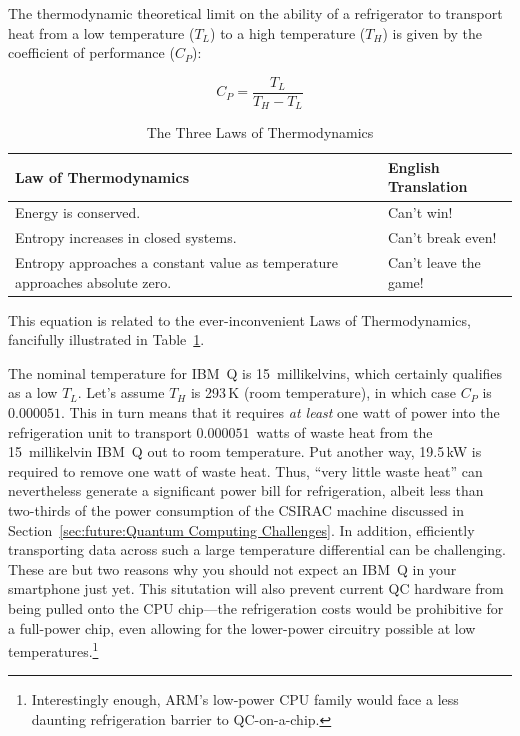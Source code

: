 The thermodynamic theoretical limit on the ability of a refrigerator
to transport heat from a low temperature ($T_L$) to a high temperature
($T_H$) is given by the coefficient of performance ($C_P$):

\begin{equation}
	C_P = \frac{T_L}{T_H - T_L}
\end{equation}

\begin{table}
\centering\footnotesize
\begin{tabular}{p{1.7in}|p{0.95in}}
Law of Thermodynamics
	& English Translation \\
\hline
\hline
Energy is conserved.
	& Can't win! \\
\hline
Entropy increases in closed systems.
	& Can't break even! \\
\hline
Entropy approaches a constant value as temperature approaches absolute zero.
	& Can't leave the game! \\
\end{tabular}
\caption{The Three Laws of Thermodynamics}
\label{tab:future:The Three Laws of Thermodynamics}
\end{table}

This equation is related to the ever-inconvenient Laws of Thermodynamics,
fancifully illustrated in
Table~\ref{tab:future:The Three Laws of Thermodynamics}.

The nominal temperature for IBM~Q is 15~millikelvins, which certainly
qualifies as a low $T_L$.
Let's assume $T_H$ is 293\,K (room temperature),
in which case $C_P$ is $0.000051$.
This in turn means that it requires \emph{at least} one watt of
power into the refrigeration unit to transport $0.000051$~watts
of waste heat from the 15~millikelvin IBM~Q out to room temperature.
Put another way, 19.5\,kW is required to remove one watt of waste heat.
Thus, ``very little waste heat'' can nevertheless generate a significant
power bill for refrigeration, albeit less than two-thirds of the power
consumption of the CSIRAC machine discussed in
Section~\ref{sec:future:Quantum Computing Challenges}.
In addition, efficiently transporting data across such a large
temperature differential can be challenging.
These are but two reasons why you should not expect an IBM~Q in your
smartphone just yet.
This situtation will also prevent current QC hardware from being pulled
onto the CPU chip---the refrigeration costs would be prohibitive for
a full-power chip, even allowing for the lower-power circuitry possible
at low temperatures.\footnote{
	Interestingly enough, ARM's low-power CPU family would face
	a less daunting refrigeration barrier to QC-on-a-chip.}

